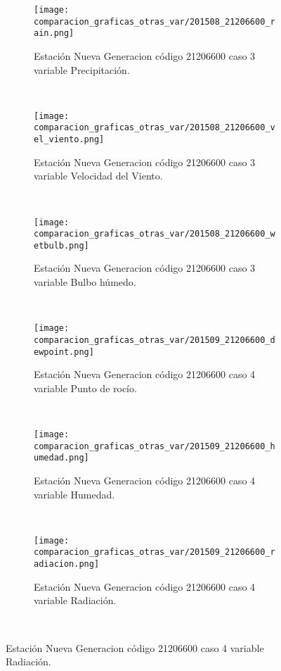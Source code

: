 \begin{figure}[H]
\centering
\begin{subfigure}[normla]{0.4\textwidth}
\caption{Estación Nueva Generacion código 21206600 caso 3 variable Precipitación.}
\texttt{[image: comparacion\_graficas\_otras\_var/201508\_21206600\_rain.png]}
\end{subfigure}
~
\begin{subfigure}[normla]{0.4\textwidth}
\caption{Estación Nueva Generacion código 21206600 caso 3 variable Velocidad del Viento.}
\texttt{[image: comparacion\_graficas\_otras\_var/201508\_21206600\_vel\_viento.png]}
\end{subfigure}
~
\begin{subfigure}[normla]{0.4\textwidth}
\caption{Estación Nueva Generacion código 21206600 caso 3 variable Bulbo húmedo.}
\texttt{[image: comparacion\_graficas\_otras\_var/201508\_21206600\_wetbulb.png]}
\end{subfigure}
~
\begin{subfigure}[normla]{0.4\textwidth}
\caption{Estación Nueva Generacion código 21206600 caso 4 variable Punto de rocío.}
\texttt{[image: comparacion\_graficas\_otras\_var/201509\_21206600\_dewpoint.png]}
\end{subfigure}
~
\begin{subfigure}[normla]{0.4\textwidth}
\caption{Estación Nueva Generacion código 21206600 caso 4 variable Humedad.}
\texttt{[image: comparacion\_graficas\_otras\_var/201509\_21206600\_humedad.png]}
\end{subfigure}
~
\begin{subfigure}[normla]{0.4\textwidth}
\caption{Estación Nueva Generacion código 21206600 caso 4 variable Radiación.}
\texttt{[image: comparacion\_graficas\_otras\_var/201509\_21206600\_radiacion.png]}
\end{subfigure}
~
\end{figure}
           
